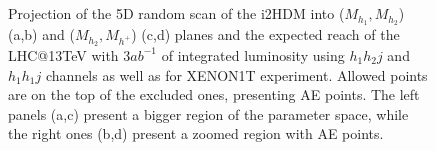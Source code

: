 %
\begin{figure}[htb]
%
\\
%
\\
\caption{\label{collider-XENON1T-constraint-AE-other}
Projection of the 5D random scan of the i2HDM into ($M_{h_1},M_{h_2}$) (a,b)
and ($M_{h_2},M_{h^+}$) (c,d) planes
and the expected  reach of the LHC@13TeV with 3$ab^{-1}$ of integrated luminosity 
using  $h_1 h_2 j$  and  $h_1 h_1 j$ channels as well as for XENON1T experiment.
Allowed points are on the top of the excluded ones,
presenting AE points. The left panels (a,c) present a bigger region of the parameter space, while the
right ones (b,d) present a zoomed region with AE points.} 
\end{figure}
